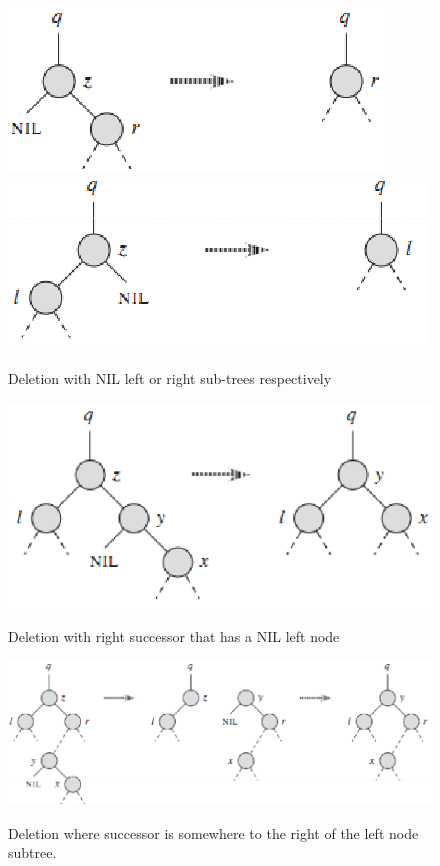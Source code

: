\documentclass[10pt,a4paper]{article}
\begin{document}
\begin{figure}
\caption{Deletion with NIL left or right sub-trees respectively}
\begin{center}
\includegraphics[scale=0.43]{../images/bstdeletea.png}
\includegraphics[scale=0.43]{../images/bstdeleteb.png}
\label{bstdelab}
\end{center}
\end{figure}

\begin{figure}
\caption{Deletion with right successor that has a NIL left node}
\begin{center}
\includegraphics[scale=0.43]{../images/bstdeletec.png}
\label{bstdelc}
\end{center}
\end{figure}

\begin{figure}
\caption{Deletion where successor is somewhere to the right of the left node subtree.}
\begin{center}
\includegraphics[scale=0.40]{../images/bstdeleted.png}
\label{bstdeld}
\end{center}
\end{figure}
\end{document}
